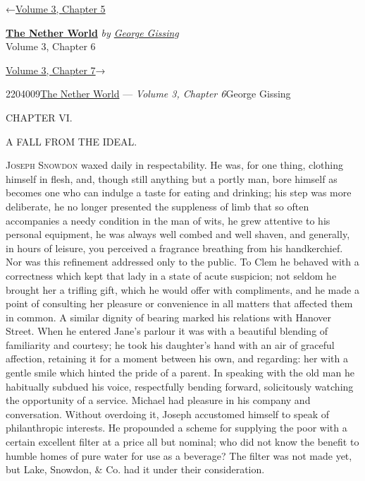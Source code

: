 \hypertarget{headerContainer}{}
\hypertarget{navigationHeader}{}
\protect\hypertarget{headerprevious}{}{←\href{/wiki/The_Nether_World/Volume_3/Chapter_5}{Volume
3, Chapter 5}}

\textbf{\protect\hypertarget{header_title_text}{}{\href{/wiki/The_Nether_World}{The
Nether World}}} \emph{by
\href{/wiki/Author:George_Gissing}{\protect\hypertarget{header_author_text}{}{{George
Gissing}}}}\\
\protect\hypertarget{header_section_text}{}{Volume 3, Chapter 6}

\protect\hypertarget{headernext}{}{\href{/wiki/The_Nether_World/Volume_3/Chapter_7}{Volume
3, Chapter 7}→}

\hypertarget{navigationNotes}{}

\hypertarget{ws-data}{}
\protect\hypertarget{ws-article-id}{}{2204009}\protect\hypertarget{ws-title}{}{\href{/wiki/The_Nether_World}{The
Nether World} --- \emph{Volume 3, Chapter
6}}\protect\hypertarget{ws-author}{}{George Gissing}

{\protect\hypertarget{120}{}{}}

{CHAPTER VI.}

A FALL FROM THE IDEAL.

\textsc{Joseph Snowdon} waxed daily in respectability. He was, for one
thing, clothing himself in flesh, and, though still anything but a
portly man, bore himself as becomes one who can indulge a taste for
eating and drinking; his step was more deliberate, he no longer
presented the suppleness of limb that so often accompanies a needy
condition in the man of wits, he grew attentive to his personal
equipment, he was always well combed and well shaven, and generally, in
hours of leisure, you perceived a fragrance breathing from his
handkerchief. Nor was this refinement addressed only to the public. To
Clem he behaved with a correctness which kept that lady in a state of
acute suspicion; not seldom he brought her a trifling gift, which he
would offer with compliments, and he made a point of consulting her
{\protect\hypertarget{121}{}{}}pleasure or convenience in all matters
that affected them in common. A similar dignity of bearing marked his
relations with Hanover Street. When he entered Jane's parlour it was
with a beautiful blending of familiarity and courtesy; he took his
daughter's hand with an air of graceful affection, retaining it for a
moment between his own, and regarding: her with a gentle smile which
hinted the pride of a parent. In speaking with the old man he habitually
subdued his voice, respectfully bending forward, solicitously watching
the opportunity of a service. Michael had pleasure in his company and
conversation. Without overdoing it, Joseph accustomed himself to speak
of philanthropic interests. He propounded a scheme for supplying the
poor with a certain excellent filter at a price all but nominal; who did
not know the benefit to humble homes of pure water for use as a
beverage? The filter was not made yet, but Lake, Snowdon, \& Co. had it
under their consideration.

